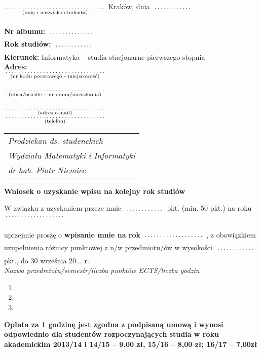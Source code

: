 \documentclass[a4paper,11pt]{article}
\newcommand{\fillField}[2]{
    $\underset{\text{#1}}{\parbox[t]{#2}{\dotfill}}$
}
\begin{document}
\noindent
\fillField{(imię i nazwisko studenta)}{5cm} \hfill Kraków, dnia \fillField{}{2cm} \\\\
\textbf{Nr albumu:}   \fillField{}{2.3cm}\\
\textbf{Rok studiów:} \fillField{}{2cm}\\
\textbf{Kierunek:} Informatyka -- studia stacjonarne pierwszego stopnia\\
\textbf{Adres:}\\
\fillField{(nr kodu pocztowego - miejscowość)}{5cm}\\\\
\fillField{(ulica/osiedle – nr domu/mieszkania)}{5cm}\\\\
\fillField{(adres e-mail)}{5cm}\\
\fillField{(telefon)}{5cm}
\phantom{a}\hfill
\begin{tabular}[c]{@{}l@{}}
\textit{Prodziekan ds. studenckich} \\
\textit{Wydziału Matematyki i Informatyki}\\
\textit{dr hab. Piotr Niemiec}
\end{tabular}

\vskip 1.0cm

\begin{center}
{\Large \textbf{Wniosek o uzyskanie wpisu na kolejny rok studiów}}
\end{center}

\vskip 0.5cm

\noindent
W związku z uzyskaniem przeze mnie \fillField{}{2cm} pkt. (min. 50 pkt.) na roku \fillField{}{3cm}
uprzejmie proszę o \textbf{wpisanie mnie na rok} \fillField{}{3cm}, z obowiązkiem uzupełnienia różnicy punktowej z n/w przedmiotu/ów
 w wysokości \fillField{}{2cm} pkt., do 30 września 20$\ldots$ r.\\

\noindent
\textit{Nazwa przedmiotu/semestr/liczba punktów ECTS/liczba godzin}
\begin{enumerate}
    \item \dotfill
    \item \dotfill
    \item \dotfill
\end{enumerate}
{\footnotesize \bf Opłata za 1 godzinę jest zgodna z podpisaną umową i wynosi odpowiednio dla studentów rozpoczynających studia w roku akademickim 2013/14 i 14/15 – 9,00 zł, 15/16 – 8,00 zł; 16/17 – 7,00zł}\\
\end{document}
